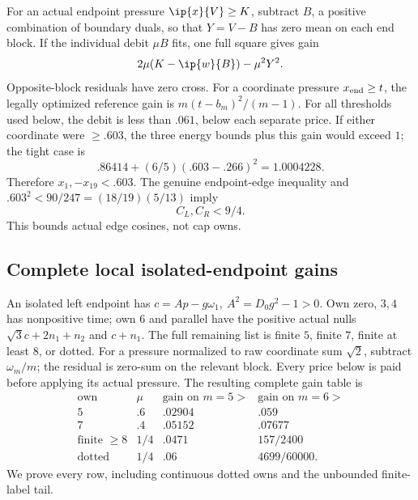 For an actual endpoint pressure \(\ip{x}{V}\geq K\),
subtract \(B\), a positive combination of boundary
duals, so that \(Y=V-B\) has zero mean on each
end block. If the individual debit \(\mu B\)
fits, one full square gives gain
\[
 2\mu(K-\ip{w}{B})-\mu^2Y^2.
\]
Opposite-block residuals have zero cross.
For a coordinate pressure \(x_{\rm end}\geq t\),
the legally optimized reference gain is
\(m(t-b_m)^2/(m-1)\).
For all thresholds used below, the debit is
less than \(.061\), below each separate price.
If either coordinate were \(\geq.603\), the
three energy bounds plus this gain would exceed
\(1\); the tight case is
\[
 .86414+(6/5)(.603-.266)^2=1.0004228.
\]
Therefore \(x_1,-x_{19}<.603\).
The genuine endpoint-edge inequality and
\(.603^2<90/247=(18/19)(5/13)\) imply
\begin{equation}\label{app:eq:A18shortends}
 C_L,C_R<9/4.
\end{equation}
This bounds actual edge cosines, not cap owns.

\subsection{Complete local isolated-endpoint gains}
An isolated left endpoint has
\(c=A p-g\omega_1,\ A^2=D_0g^2-1>0\).
Own zero, \(3,4\) has nonpositive time; own
\(6\) and parallel have the positive actual
nulls \(\sqrt3c+2n_1+n_2\) and \(c+n_1\).
The full remaining list is finite \(5\), finite
\(7\), finite at least \(8\), or dotted.
For a pressure normalized to raw coordinate
sum \(\sqrt2\), subtract \(\omega_m/m\);
the residual is zero-sum on the relevant block.
Every price below is paid before applying its
actual pressure. The resulting complete gain
table is
\[
\begin{array}{c|c|c|c}
\text{own}&\mu&\text{gain on }m=5>&
 \text{gain on }m=6>\\ \hline
5&.6&.02904&.059\\
7&.4&.05152&.07677\\
\text{finite }\geq8&1/4&.0471&157/2400\\
\text{dotted}&1/4&.06&4699/60000.
\end{array}
\]
We prove every row, including continuous dotted
owns and the unbounded finite-label tail.

